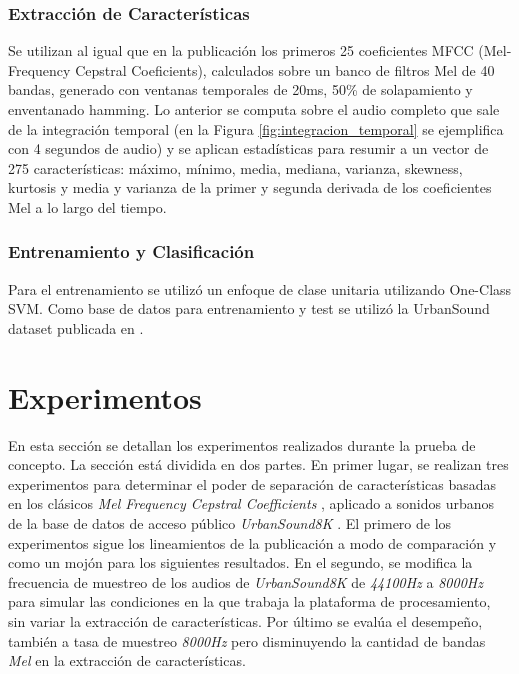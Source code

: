 \documentclass{article}
\begin{document}
\subsubsection*{Extracción de Características}
Se utilizan al igual que en la publicación \cite{Salamon:UrbanSound:ACMMM:14} los primeros 25 coeficientes MFCC (Mel-Frequency Cepstral Coeficients), calculados sobre un banco de filtros Mel de 40 bandas, generado con ventanas temporales de 20ms, 50\% de solapamiento y enventanado hamming. Lo anterior se computa sobre el audio completo que sale de la integración temporal (en la Figura \ref{fig:integracion_temporal} se ejemplifica con 4 segundos de audio) y se aplican estadísticas para resumir a un vector de 275 características: máximo, mínimo, media, mediana, varianza, skewness, kurtosis y media y varianza de la primer y segunda derivada de los coeficientes Mel a lo largo del tiempo.

\subsubsection*{Entrenamiento y Clasificación}
Para el entrenamiento se utilizó un enfoque de clase unitaria utilizando One-Class SVM. Como base de datos para entrenamiento y test se utilizó la UrbanSound dataset publicada en \cite{Salamon:UrbanSound:ACMMM:14}. 


\section{Experimentos}
\label{experimentos}

En esta sección se detallan los experimentos realizados durante la prueba de concepto. La sección está dividida en dos partes. En primer lugar, se realizan tres experimentos para determinar el poder de separación de características basadas en los clásicos \textit{Mel Frequency Cepstral Coefficients} \citep{davis1980comparison}, aplicado a sonidos urbanos de la base de datos de acceso público \textit{UrbanSound8K} \citep{Salamon:UrbanSound:ACMMM:14}. El primero de los experimentos sigue los lineamientos de la publicación \citep{Salamon:UrbanSound:ACMMM:14} a modo de comparación y como un mojón para los siguientes resultados. En el segundo, se modifica la frecuencia de muestreo de los audios de \textit{UrbanSound8K} de \textit{44100Hz} a \textit{8000Hz} para simular las condiciones en la que trabaja la plataforma de procesamiento, sin variar la extracción de características. Por último se evalúa el desempeño, también a tasa de muestreo \textit{8000Hz} pero disminuyendo la cantidad de bandas \textit{Mel} en la extracción de características. 
\end{document}
